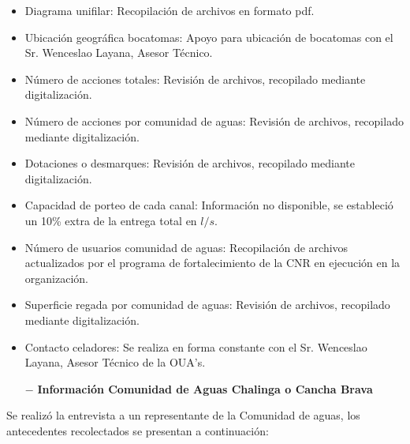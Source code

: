 \documentclass[]{article}
\begin{document}
\begin{itemize}	
	\item Diagrama unifilar: Recopilación de archivos en formato pdf.
	\item Ubicación geográfica bocatomas: Apoyo para ubicación de bocatomas con el Sr. Wenceslao Layana, Asesor Técnico.
	\item Número de acciones totales: Revisión de archivos, recopilado mediante digitalización.
	\item Número de acciones por comunidad de aguas: Revisión de archivos, recopilado mediante digitalización.
	\item Dotaciones o desmarques: Revisión de archivos, recopilado mediante digitalización.
	\item Capacidad de porteo de cada canal: Información no disponible, se estableció un 10\% extra de la entrega total en $l/s$.
	\item Número de usuarios comunidad de aguas: Recopilación de archivos actualizados por el programa de fortalecimiento de la CNR en ejecución en la organización.
	\item Superficie regada por comunidad de aguas: Revisión de archivos, recopilado mediante digitalización.
	\item Contacto celadores: Se realiza en forma constante con el Sr. Wenceslao Layana, Asesor Técnico de la OUA's.
\end{itemize}
\clearpage
\begin{itemize}
	\item[$-$] \textbf{Información Comunidad de Aguas Chalinga o Cancha Brava}
\end{itemize}

Se realizó la entrevista a un representante de la Comunidad de aguas, los antecedentes recolectados se presentan a continuación:
\end{document}
